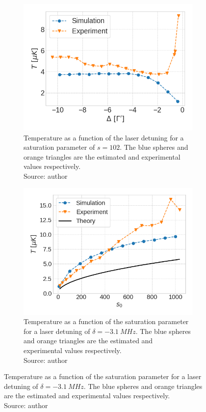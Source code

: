 \begin{figure}[!ht]
    \centering
    \caption{Temperature of the IFSC nMOT}
    \begin{subfigure}[b]{0.48\linewidth}
        \centering
        \includegraphics[width=\textwidth]{USPSC-img/sr-ifsc-temperature_vs_detuning.png}
        \caption{Temperature as a function of the laser detuning for a saturation parameter of $ s = 102 $. The blue spheres and orange triangles are the estimated and experimental values respectively. \\ Source: author}
        \label{fig:IFSC-temperature-detuning}
    \end{subfigure}
    \hfill
    \begin{subfigure}[b]{0.48\linewidth}
        \centering
        \includegraphics[width=\textwidth]{USPSC-img/sr_ifsc_temperature_vs_saturation.png}
        \caption{Temperature as a function of the saturation parameter for a laser detuning of $ \delta = -3.1\ MHz $. The blue spheres and orange triangles are the estimated and experimental values respectively. \\ Source: author}
        \label{fig:IFSC-temperature-detuning}
    \end{subfigure}
\end{figure}
